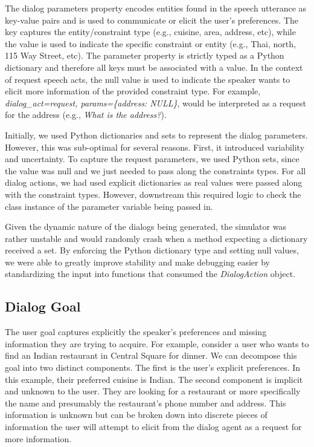 The dialog parameters property encodes entities found in the speech utterance as key-value pairs and is used to communicate or elicit the user's preferences. The key captures the entity/constraint type (e.g., cuisine, area, address, etc), while the value is used to indicate the specific constraint or entity (e.g., Thai, north, 115 Way Street, etc). The parameter property is strictly typed as a Python dictionary and therefore all keys must be associated with a value. In the context of request speech acts, the null value is used to indicate the speaker wants to elicit more information of the provided constraint type. For example, \textit{dialog\_act=request, params=\{address: NULL\}}, would be interpreted as a request for the address (e.g., \textit{What is the address?}). 

Initially, we used Python dictionaries and sets to represent the dialog parameters. However, this was sub-optimal for several reasons. First, it introduced variability and uncertainty. To capture the request parameters, we used Python sets, since the value was null and we just needed to pass along the constraints types. For all dialog actions, we had used explicit dictionaries as real values were passed along with the constraint types. However, downstream this required logic to check the class instance of the parameter variable being passed in. 

Given the dynamic nature of the dialogs being generated, the simulator was rather unstable and would randomly crash when a method expecting a dictionary received a set. By enforcing the Python dictionary type and setting null values, we were able to greatly improve stability and make debugging easier by standardizing the input into functions that consumed the \textit{DialogAction} object. 
\clearpage

\subsection{Dialog Goal}
\label{sec:dialog_goal}

The user goal captures explicitly the speaker's preferences and missing information they are trying to acquire. For example, consider a user who wants to find an Indian restaurant in Central Square for dinner. We can decompose this goal into two distinct components. The first is the user's explicit preferences. In this example, their preferred cuisine is Indian. The second component is implicit and unknown to the user. They are looking for a restaurant or more specifically the name and presumably the restaurant's phone number and address. This information is unknown but can be broken down into discrete pieces of information the user will attempt to elicit from the dialog agent as a request for more information. 

